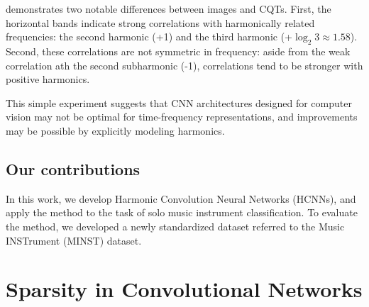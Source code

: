 \documentclass{article}
\begin{document}
 demonstrates two notable differences between images and CQTs.
First, the horizontal bands indicate strong correlations with harmonically related frequencies: the second harmonic (+1) and the third harmonic (+$\log_2 3 \approx 1.58$).
Second, these correlations are not symmetric in frequency: aside from the weak correlation ath the second subharmonic (-1), correlations tend to be stronger with positive harmonics.

This simple experiment suggests that CNN architectures designed for computer vision may not be optimal for time-frequency representations, and improvements may be possible by explicitly modeling harmonics.

\subsection{Our contributions}
In this work, we develop Harmonic Convolution Neural Networks (HCNNs), and apply the method to the task of solo music instrument classification.
To evaluate the method, we developed a newly standardized dataset referred to the Music INSTrument (MINST) dataset.


\section{Sparsity in Convolutional Networks}\label{sec:page_size}

\end{document}

